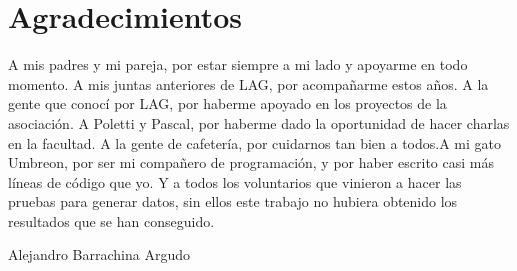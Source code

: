 
\chapter*{Agradecimientos}

A mis padres y mi pareja, por estar siempre a mi lado y apoyarme en todo momento. A mis juntas anteriores de LAG, por acompañarme estos años. A la gente que conocí por LAG, por haberme apoyado en los proyectos de la asociación. A Poletti y Pascal, por haberme dado la oportunidad de hacer charlas en la facultad. A la gente de cafetería, por cuidarnos tan bien a todos.A mi gato Umbreon, por ser mi compañero de programación, y por haber escrito casi más líneas de código que yo. Y a todos los voluntarios que vinieron a hacer las pruebas para generar datos, sin ellos este trabajo no hubiera obtenido los resultados que se han conseguido.

\begin{flushright}
    Alejandro Barrachina Argudo
\end{flushright}











